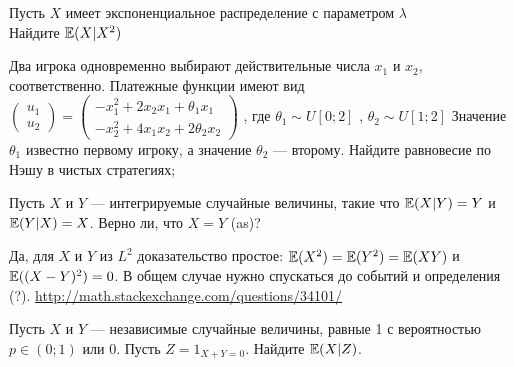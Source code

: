 \begin{problem}
Пусть $X$ имеет экспоненциальное распределение с параметром $\lambda$ \\
Найдите $\mathbb{E}(X|X^{2})$

\begin{sol}

\end{sol}
\end{problem}

\begin{problem}
Два игрока одновременно выбирают действительные числа  $x_{1} $  и
$x_{2} $, соответственно. Платежные функции имеют вид
 $\left(\begin{array}{l} {u_{1} } \\
 {u_{2} } \end{array}\right)=
 \left(\begin{array}{l} {-x_{1}^{2} +2x_{2} x_{1} +\theta _{1} x_{1} } \\
 {-x_{2}^{2} +4x_{1} x_{2} +2\theta _{2} x_{2} } \end{array}\right)$ ,
 где  $\theta _{1} \sim U\left[0;2\right]$ ,  $\theta _{2} \sim U\left[1;2\right]$
Значение  $\theta _{1} $  известно первому игроку, а значение
$\theta _{2} $  — второму. Найдите равновесие по Нэшу в чистых
стратегиях;

\begin{sol}

\end{sol}
\end{problem}

\begin{problem}
 Пусть $X$ и $Y$ — интегрируемые случайные величины, такие что
$\mathbb{E}(X|Y)=Y$ и $\mathbb{E}(Y|X)=X$. Верно ли, что $X=Y$ (as)?

\begin{sol}
Да, для $X$ и $Y$ из $L^2$ доказательство простое: $\mathbb{E}(X^2)=\mathbb{E}(Y^2)=\mathbb{E}(XY)$ и $\mathbb{E}((X-Y)^2)=0$. В общем случае нужно спускаться до событий и определения (?).
\url{http://math.stackexchange.com/questions/34101/}

\end{sol}
\end{problem}

\begin{problem}
Пусть $X$ и $Y$ — независимые случайные величины, равные 1 с
вероятностью $p\in(0;1)$ или 0. Пусть $Z=1_{X+Y=0}$. Найдите
$\mathbb{E}(X|Z)$.

\begin{sol}

\end{sol}
\end{problem}

